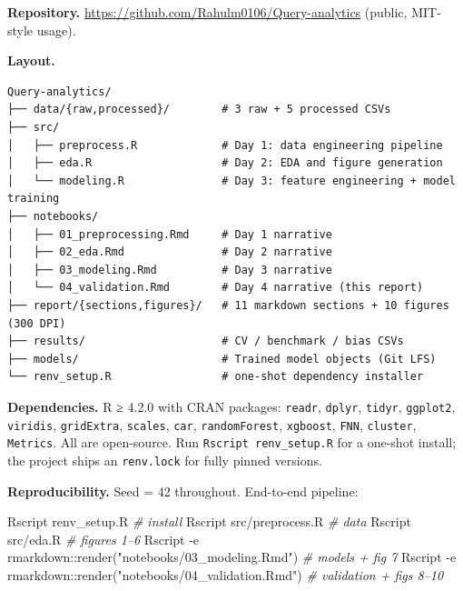 \documentclass[
  10pt,
  twocolumn,
  10pt]{article}
\newenvironment{Shaded}{\begin{snugshade}}{\end{snugshade}}
\newcommand{\AttributeTok}[1]{\textcolor[rgb]{0.13,0.29,0.53}{#1}}
\newcommand{\CommentTok}[1]{\textcolor[rgb]{0.56,0.35,0.01}{\textit{#1}}}
\newcommand{\ExtensionTok}[1]{#1}
\newcommand{\NormalTok}[1]{#1}
\newcommand{\StringTok}[1]{\textcolor[rgb]{0.31,0.60,0.02}{#1}}
\begin{document}
\textbf{Repository.} \url{https://github.com/Rahulm0106/Query-analytics}
(public, MIT-style usage).

\textbf{Layout.}

\begin{verbatim}
Query-analytics/
├── data/{raw,processed}/        # 3 raw + 5 processed CSVs
├── src/
│   ├── preprocess.R             # Day 1: data engineering pipeline
│   ├── eda.R                    # Day 2: EDA and figure generation
│   └── modeling.R               # Day 3: feature engineering + model training
├── notebooks/
│   ├── 01_preprocessing.Rmd     # Day 1 narrative
│   ├── 02_eda.Rmd               # Day 2 narrative
│   ├── 03_modeling.Rmd          # Day 3 narrative
│   └── 04_validation.Rmd        # Day 4 narrative (this report)
├── report/{sections,figures}/   # 11 markdown sections + 10 figures (300 DPI)
├── results/                     # CV / benchmark / bias CSVs
├── models/                      # Trained model objects (Git LFS)
└── renv_setup.R                 # one-shot dependency installer
\end{verbatim}

\textbf{Dependencies.} R ≥ 4.2.0 with CRAN packages: \texttt{readr},
\texttt{dplyr}, \texttt{tidyr}, \texttt{ggplot2}, \texttt{viridis},
\texttt{gridExtra}, \texttt{scales}, \texttt{car},
\texttt{randomForest}, \texttt{xgboost}, \texttt{FNN}, \texttt{cluster},
\texttt{Metrics}. All are open-source. Run
\texttt{Rscript\ renv\_setup.R} for a one-shot install; the project
ships an \texttt{renv.lock} for fully pinned versions.

\textbf{Reproducibility.} Seed = 42 throughout. End-to-end pipeline:

\begin{Shaded}
\begin{Highlighting}[]
\ExtensionTok{Rscript}\NormalTok{ renv\_setup.R                                    }\CommentTok{\# install}
\ExtensionTok{Rscript}\NormalTok{ src/preprocess.R                                }\CommentTok{\# data}
\ExtensionTok{Rscript}\NormalTok{ src/eda.R                                       }\CommentTok{\# figures 1–6}
\ExtensionTok{Rscript} \AttributeTok{{-}e} \StringTok{\textquotesingle{}rmarkdown::render("notebooks/03\_modeling.Rmd")\textquotesingle{}}   \CommentTok{\# models + fig 7}
\ExtensionTok{Rscript} \AttributeTok{{-}e} \StringTok{\textquotesingle{}rmarkdown::render("notebooks/04\_validation.Rmd")\textquotesingle{}} \CommentTok{\# validation + figs 8–10}
\end{Highlighting}
\end{Shaded}
\end{document}
